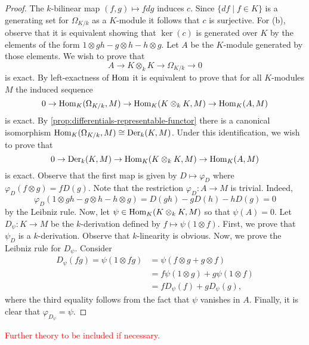 \begin{proof}
	The $k$-bilinear map $(f,g) \mapsto fdg$ induces $c$. Since $\{df \mid f\in K\}$ is a generating set for $\Omega_{K/k}$ as a $K$-module it follows that $c$ is surjective. For (b), observe that it is equivalent showing that $\ker(c)$ is generated over $K$ by the elements of the form $1 \otimes gh - g \otimes h - h \otimes g$. Let $A$ be the $K$-module generated by those elements. We wish to prove that
	\[
		A \to K \otimes_{k} K \to \Omega_{K/k} \to 0
	\]
	is exact. By left-exactness of $\operatorname{Hom}$ it is equivalent to prove that for all $K$-modules $M$ the induced sequence
	\[
		0 \to \operatorname{Hom}_{K}(\Omega_{K/k}, M) \to \operatorname{Hom}_{K}(K \otimes_{k} K, M) \to \operatorname{Hom}_{K}(A, M) 
	\]
	is exact. By \cref{prop:differentials-representable-functor} there is a canonical isomorphism $\operatorname{Hom}_{K}(\Omega_{K/k}, M) \cong \operatorname{Der}_{k}(K, M)$. Under this identification, we wish to prove that
	\[
		0 \to \operatorname{Der}_{k}(K, M) \to \operatorname{Hom}_{K}(K \otimes_{k} K, M) \to \operatorname{Hom}_{K}(A, M) 
	\]
	is exact. Observe that the first map is given by $D \mapsto \varphi_{D}$ where $\varphi_{D}(f \otimes g) = f D(g)$. Note that the restriction $\varphi_{D}\colon A \to M$ is trivial. Indeed,
	\[
		\varphi_{D}(1 \otimes gh - g \otimes h - h \otimes g) = D(gh) - gD(h) - hD(g) = 0
	\]
	by the Leibniz rule. Now, let $\psi\in \operatorname{Hom}_{K}(K \otimes_{k} K, M)$ so that $\psi(A) = 0$. Let $D_{\psi}\colon K \to M$ be the $k$-derivation defined by $f \mapsto \psi(1 \otimes f)$. First, we prove that $\psi_{D}$ is a $k$-derivation. Observe that $k$-linearity is obvious. Now, we prove the Leibniz rule for $D_{\psi}$. Consider
	\begin{align*}
		D_{\psi}(fg) = \psi(1 \otimes fg) &= \psi(f \otimes g + g \otimes f) \\ &= f \psi (1 \otimes g) + g \psi (1 \otimes f) \\ &= f D_{\psi} (f) + g D_{\psi} (g),
	\end{align*}
	where the third equality follows from the fact that $\psi$ vanishes in $A$. Finally, it is clear that $\varphi_{D_{\psi}} = \psi$. 
\end{proof}
\textcolor{red}{Further theory to be included if necessary.}
